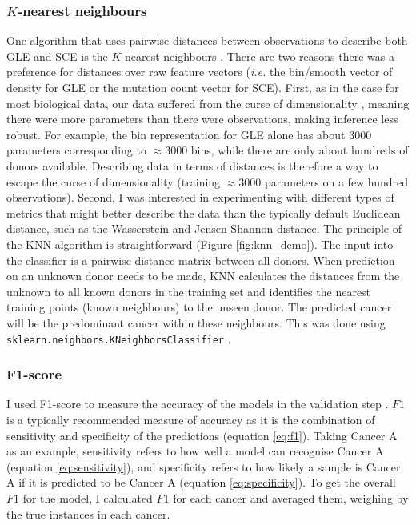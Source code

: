 \subsubsection{$K$-nearest neighbours}
One algorithm that uses pairwise distances between observations to describe both GLE and SCE is the $K$-nearest neighbours \citep[KNN;][]{Neath2010DiscriminationClassification}. There are two reasons there was a preference for distances over raw feature vectors (\textit{i.e.} the bin/smooth vector of density for GLE or the mutation count vector for SCE). First, as in the case for most biological data, our data suffered from the curse of dimensionality \citep{Banks2003DataStatistics}, meaning there were more parameters than there were observations, making inference less robust. For example, the bin representation for GLE alone has about 3000 parameters corresponding to $\approx$3000 bins, while there are only about hundreds of donors available. Describing data in terms of distances is therefore a way to escape the curse of dimensionality (training $\approx$3000 parameters on a few hundred observations). Second, I was interested in experimenting with different types of metrics that might better describe the data than the typically default Euclidean distance, such as the Wasserstein and Jensen-Shannon distance. The principle of the KNN algorithm is straightforward (Figure \ref{fig:knn_demo}). The input into the classifier is a pairwise distance matrix between all donors. When prediction on an unknown donor needs to be made, KNN calculates the distances from the unknown to all known donors in the training set and identifies the nearest training points (known neighbours) to the unseen donor. The predicted cancer will be the predominant cancer within these neighbours. This was done using \texttt{sklearn.neighbors.KNeighborsClassifier} \citep{scikit-learn}.



\newpage
\subsubsection{F1-score}
I used F1-score to measure the accuracy of the models in the validation step \citep{Kulkarni2020FoundationsDemocracy}. $F1$ is a typically recommended measure of accuracy as it is the combination of sensitivity and specificity of the predictions (equation \ref{eq:f1}). Taking Cancer A as an example, sensitivity refers to how well a model can recognise Cancer A (equation \ref{eq:sensitivity}), and specificity refers to how likely a sample is Cancer A if it is predicted to be Cancer A (equation \ref{eq:specificity}). To get the overall $F1$ for the model, I calculated $F1$ for each cancer and averaged them, weighing by the true instances in each cancer.

